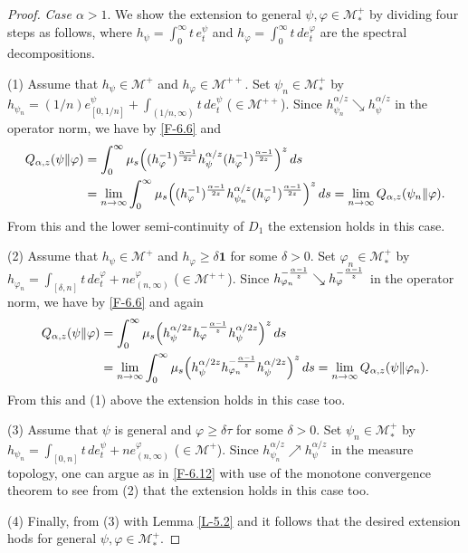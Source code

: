 \documentclass[12pt]{article}
\theoremstyle{definition}
\theoremstyle{remark}
\numberwithin{equation}{section}
\def\Me{\mathcal M}
\def\ffi{\varphi}
\def\1{\mathbf{1}}
\begin{document}
\begin{proof}
{\it Case $\alpha>1$}.\enspace
We show the extension to general $\psi,\ffi\in\Me_*^+$ by dividing four steps as follows, where
$h_\psi=\int_0^\infty t\,e_t^\psi$ and $h_\ffi=\int_0^\infty t\,de_t^\ffi$ are the spectral decompositions.

(1)\enspace
Assume that $h_\psi\in\Me^+$ and $h_\ffi\in\Me^{++}$. Set $\psi_n\in\Me_*^+$ by
$h_{\psi_n}=(1/n)e_{[0,1/n]}^\psi+\int_{(1/n,\infty)}t\,de_t^\psi$ ($\in\Me^{++}$). Since
$h_{\psi_n}^{\alpha/z}\searrow h_\psi^{\alpha/z}$ in the operator norm, we have by \eqref{F-6.6} and
\cite[Lemma 3.4]{fack1986generalized}
\begin{align}
Q_{\alpha,z}(\psi\|\ffi)&=\int_0^\infty\mu_s\Bigl((h_\ffi^{-1})^{\alpha-1\over2z}h_\psi^{\alpha/z}
(h_\ffi^{-1})^{\alpha-1\over2z}\Bigr)^z\,ds \nonumber\\
&=\lim_{n\to\infty}\int_0^\infty\mu_s\Bigl((h_\ffi^{-1})^{\alpha-1\over2z}h_{\psi_n}^{\alpha/z}
(h_\ffi^{-1})^{\alpha-1\over2z}\Bigr)^z\,ds
=\lim_{n\to\infty}Q_{\alpha,z}(\psi_n\|\ffi). \label{F-6.12}
\end{align}
From this and the lower semi-continuity of $D_1$ the extension holds in this case.

(2)\enspace
Assume that $h_\psi\in\Me^+$ and $h_\ffi\ge\delta\1$ for some $\delta>0$. Set $\ffi_n\in\Me_*^+$
by $h_{\ffi_n}=\int_{[\delta,n]}t\,de_t^\ffi+ne_{(n,\infty)}^\ffi$ ($\in\Me^{++}$). Since
$h_{\ffi_n}^{-{\alpha-1\over z}}\searrow h_\ffi^{-{\alpha-1\over z}}$ in the operator norm, we have by
\eqref{F-6.6} and \cite[Lemma 3.4]{fack1986generalized} again
\begin{align*}
Q_{\alpha,z}(\psi\|\ffi)&=\int_0^\infty\mu_s\Bigl(h_\psi^{\alpha/2z}h_\ffi^{-{\alpha-1\over z}}
h_\psi^{\alpha/2z}\Bigr)^z\,ds \\
&=\lim_{n\to\infty}\int_0^\infty\mu_s\Bigl(h_\psi^{\alpha/2z}h_{\ffi_n}^{-{\alpha-1\over z}}
h_\psi^{\alpha/2z}\Bigr)^z\,ds
=\lim_{n\to\infty}Q_{\alpha,z}(\psi\|\ffi_n).
\end{align*}
From this and (1) above the extension holds in this case too.

(3)\enspace
Assume that $\psi$ is general and $\ffi\ge\delta\tau$ for some $\delta>0$. Set $\psi_n\in\Me_*^+$
by $h_{\psi_n}=\int_{[0,n]}t\,de_t^\psi+ne_{(n,\infty)}^\ffi$ ($\in\Me^+$). Since
$h_{\psi_n}^{\alpha/z}\nearrow h_\psi^{\alpha/z}$ in the measure topology, one can argue as in \eqref{F-6.12}
with use of the monotone convergence theorem to see from (2) that the extension holds in this case too.

(4)\enspace
Finally, from (3) with Lemma \ref{L-5.2} and \cite[Corollary 2.8(3)]{hiai2021quantum} it follows that
the desired extension hods for general $\psi,\ffi\in\Me_*^+$.
\end{proof}
\end{document}
